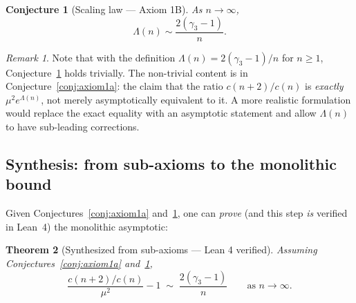 \documentclass[11pt,a4paper]{article}
\newtheorem{theorem}{Theorem}[section]
\newtheorem{conjecture}{Conjecture}[section]
\theoremstyle{definition}
\theoremstyle{remark}
\newtheorem{remark}[theorem]{Remark}
\begin{document}
\begin{conjecture}[Scaling law --- Axiom 1B]\label{conj:axiom1b}
As $n \to \infty$,
\begin{equation}\label{eq:scaling-law}
  \Lambda(n) \sim \frac{2(\gamma_3 - 1)}{n}.
\end{equation}
\end{conjecture}

\begin{remark}
Note that with the definition $\Lambda(n) = 2(\gamma_3-1)/n$ for
$n \ge 1$, Conjecture~\ref{conj:axiom1b} holds trivially.
The non-trivial content is in Conjecture~\ref{conj:axiom1a}:
the claim that the ratio $c(n+2)/c(n)$ is \emph{exactly}
$\mu^2 e^{\Lambda(n)}$, not merely asymptotically equivalent to it.
A more realistic formulation would replace the exact equality with
an asymptotic statement and allow $\Lambda(n)$ to have sub-leading
corrections.
\end{remark}

\subsection{Synthesis: from sub-axioms to the monolithic bound}

Given Conjectures~\ref{conj:axiom1a} and~\ref{conj:axiom1b},
one can \emph{prove} (and this step \emph{is} verified in Lean~4)
the monolithic asymptotic:

\begin{theorem}[Synthesized from sub-axioms --- Lean 4 verified]
\label{thm:synthesis}
Assuming Conjectures~\ref{conj:axiom1a} and~\ref{conj:axiom1b},
\begin{equation}
  \frac{c(n+2)/c(n)}{\mu^2} - 1
  \;\sim\; \frac{2(\gamma_3 - 1)}{n}
  \qquad\text{as } n \to \infty.
\end{equation}
\end{theorem}
\end{document}
